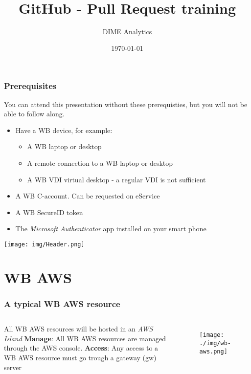 \documentclass[aspectratio=169]{beamer} %
\title{GitHub - Pull Request training}
\author{DIME Analytics}
\institute{DIME - The World Bank - \trainingURL{https://www.worldbank.org/en/research/dime}}
\date{\today}
\begin{document}
\begin{frame}
	\frametitle{Prerequisites}

		You can attend this presentation without these prerequisties, but you will not be able to follow along.
		
		\begin{itemize}
			\setlength\itemsep{1em}
			\item Have a WB device, for example:		
			\begin{itemize}
				\item A WB laptop or desktop
				\item A remote connection to a WB laptop or desktop				
				\item A WB VDI virtual desktop - a regular VDI is not sufficient
			\end{itemize}
			\item A WB C-account. Can be requested on eService
			\item A WB SecureID token
			\item The \textit{Microsoft Authenticator} app installed on your smart phone
		\end{itemize}
\end{frame}

\begin{frame}
\texttt{[image: img/Header.png]}
\vspace{-0.2cm}
\titlepage 	 %
\end{frame}


\section{WB AWS}





\begin{frame}
\frametitle{A typical WB AWS resource}

	\begin{columns}[c]
		\large All WB AWS resources will be hosted in an \textit{AWS Island}
		\vspace{.7cm}\newline
		\large \textbf{Manage}: All WB AWS resources are managed through the AWS console.
		\vspace{.7cm}\newline
		\large \textbf{Access}: Any access to a WB AWS resource must go trough a gateway (gw) server
		
		\begin{figure}
			\centering
			\texttt{[image: ./img/wb-aws.png]}
		\end{figure}

	\end{columns}
\end{frame}
\end{document}
